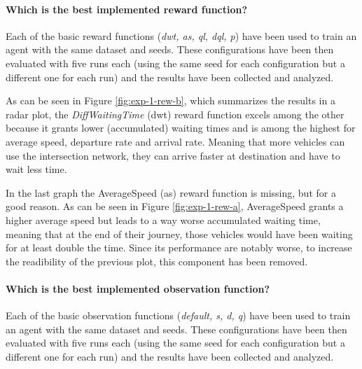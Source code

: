 \paragraph{Which is the best implemented reward function?}

Each of the basic reward functions (\textit{dwt, as, ql, dql, p}) have been used to train an agent with the same dataset and seeds.
These configurations have been then evaluated with five runs each (using the same seed for each configuration but a different one for each run) and the results have been collected and analyzed.

As can be seen in Figure \ref{fig:exp-1-rew-b}, which summarizes the results in a radar plot, the \textit{DiffWaitingTime} (dwt) reward function excels among the other because it grants lower (accumulated) waiting times and is among the highest for average speed, departure rate and arrival rate.
Meaning that more vehicles can use the intersection network, they can arrive faster at destination and have to wait less time.

In the last graph the AverageSpeed (as) reward function is missing, but for a good reason.
As can be seen in Figure \ref{fig:exp-1-rew-a}, AverageSpeed grants a higher average speed but leads to a way worse accumulated waiting time, meaning that at the end of their journey, those vehicles would have been waiting for at least double the time.
Since its performance are notably worse, to increase the readibility of the previous plot, this component has been removed.



\paragraph{Which is the best implemented observation function?}

Each of the basic observation functions (\textit{default, s, d, q}) have been used to train an agent with the same dataset and seeds. These configurations have been then evaluated with five runs each (using the same seed for each configuration but a different one for each run) and the results have been collected and analyzed.

